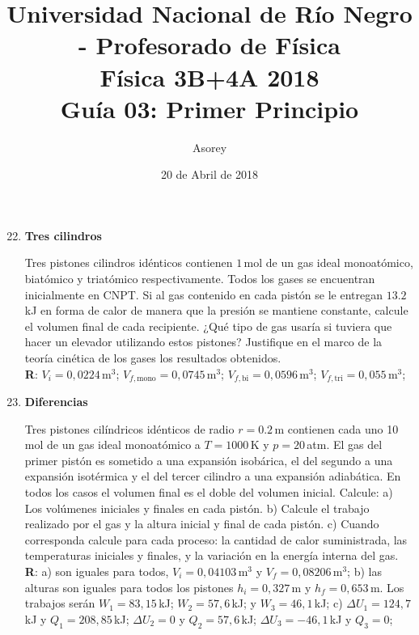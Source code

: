 \documentclass[a4paper,12pt]{article}
\begin{document}
\title{
{\normalsize{Universidad Nacional de Río Negro - Profesorado de Física}}\\
Física 3B+4A  2018 \\ Guía 03: Primer Principio
}
\author{Asorey}
\date{20 de Abril de 2018}
\maketitle

\begin{enumerate}
	\setcounter{enumi}{21}      %

    \item {\bf{Tres cilindros}}

        Tres pistones cilindros idénticos contienen $1$\,mol de un gas ideal 
        monoatómico, biatómico y triatómico respectivamente. Todos los gases se
        encuentran inicialmente en CNPT. Si al gas contenido en cada pistón se
        le entregan $13.2$\,kJ en forma de calor de manera que la presión se
        mantiene constante, calcule el volumen final de cada recipiente.
        ¿Qué tipo de gas usaría si tuviera que hacer un elevador utilizando 
        estos pistones? Justifique en el marco de la teoría cinética de los
        gases los resultados obtenidos.
		\\{\bf{R}}: $V_i=0,0224$\,m$^3$; $V_{f,\mathrm{mono}}=0,0745$\,m$^3$;
		$V_{f,\mathrm{bi}}=0,0596$\,m$^3$; $V_{f,\mathrm{tri}}=0,055$\,m$^3$;

	\item {\bf{Diferencias}}
		
		Tres pistones cilíndricos idénticos de radio $r=0.2$\,m contienen cada
		uno 10\,mol de un gas ideal monoatómico a $T=1000$\,K y $p=20$\,atm.
		El gas del primer pistón es sometido a una expansión isobárica, el del
		segundo a una expansión isotérmica y el del tercer cilindro a una
		expansión adiabática. En todos los casos el volumen final es el doble
		del volumen inicial. Calcule: a) Los volúmenes iniciales y finales en
		cada pistón. b) Calcule el trabajo realizado por el gas y la altura
		inicial y final de cada pistón. c) Cuando corresponda calcule para cada
		proceso: la cantidad de calor suministrada, las temperaturas iniciales
		y finales, y la variación en la energía interna del gas.
		\\{\bf{R}}: a) son iguales para todos, $V_i=0,04103$\,m$^3$ y
		$V_{f}=0,08206$\,m$^3$; b) las alturas son iguales para todos los
		pistones $h_i=0,327$\,m y $h_f=0,653$\,m. Los trabajos serán
		$W_1=83,15$\,kJ; $W_2=57,6$\,kJ; y $W_3=46,1$\,kJ; c) $\Delta
		U_1=124,7$\,kJ y $Q_1=208,85$\,kJ; $\Delta U_2=0$ y $Q_2=57,6$\,kJ;
		$\Delta U_3=-46,1$\,kJ y $Q_3=0$;  
	

\end{enumerate}
\end{document}
